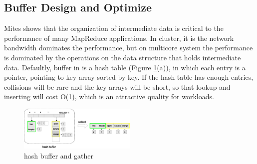%



\subsection{Buffer Design and Optimize}
Mites \cite{mao2010metis} shows that the organization of intermediate data is critical to the performance of many MapReduce applications.
In cluster, it is the network bandwidth dominates the performance, but on multicore system the performance is dominated by the operations on the  data structure that holds intermediate data.
Defaultly, buffer in \myds is a hash table (Figure \ref{fig:dmr:hash-buffer}(a)), in which each entry is a pointer, pointing to key array sorted by key.
If the hash table has enough entries, collisions will be rare and the key arrays will be short,
so that lookup and inserting will cost O(1), which is an attractive quality for workloads.


\begin{figure}[!h!t]  
	\centering
	\includegraphics[width=0.5\textwidth]{eps/dmr_hash_buffer.eps}
	\caption{hash buffer and gather}
	\label{fig:dmr:hash-buffer}
\end{figure}


